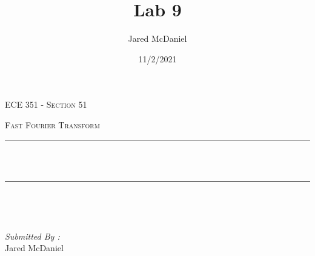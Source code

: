 \documentclass[12pt]{report}
\title{Lab 9}
\author{ Jared McDaniel}
\date{11/2/2021}
\makeatletter
\let\thetitle\@title
\makeatother
\begin{document}

\begin{titlepage}
	\centering
    \vspace*{0.5 cm}
\begin{center}    \textsc{\Large   ECE 351 - Section 51 }\\[2.0 cm]	\end{center}%
	\textsc{\Large Fast Fourier Transform  }\\[0.5 cm]				%
	\rule{\linewidth}{0.2 mm} \\[0.4 cm]
	{ \huge \bfseries \thetitle}\\
	\rule{\linewidth}{0.2 mm} \\[1.5 cm]
	
	\begin{minipage}{0.4\textwidth}
		\begin{flushleft} \large
			\end{flushleft}
			\end{minipage}~
			\begin{minipage}{0.4\textwidth}
            
			\begin{flushright} \large
			\emph{Submitted By :} \\
			Jared McDaniel  
		\end{flushright}
           
	\end{minipage}\\[2 cm]
	
    
    
    
    
	
\end{titlepage}


\tableofcontents
\pagebreak

\renewcommand{\thesection}{\arabic{section}}
\end{document}
